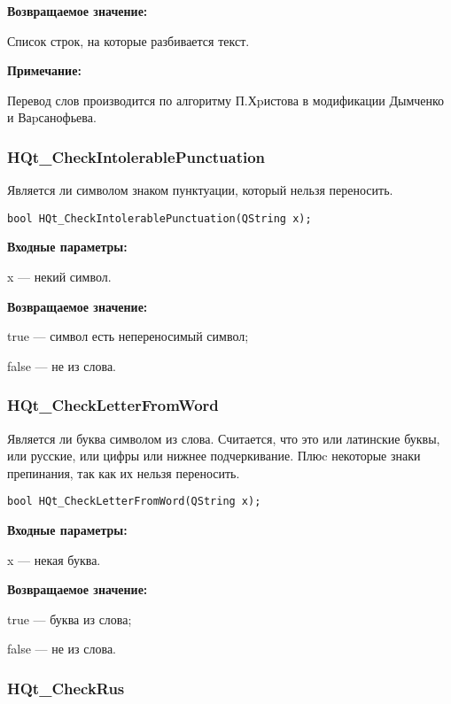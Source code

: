 \documentclass[a4paper,12pt]{article}
\begin{document}
\textbf{Возвращаемое значение:}
 
Список строк, на которые разбивается текст.

\textbf{Примечание:}

Перевод слов производится по алгоритму П.Хpистова в модификации Дымченко и Ваpсанофьева.


\subsubsection{HQt\_CheckIntolerablePunctuation}\label{HQt_CheckIntolerablePunctuation}

Является ли символом знаком пунктуации, который нельзя переносить.


\begin{lstlisting}[label=code_syntax_HQt_CheckIntolerablePunctuation,caption=Синтаксис]
bool HQt_CheckIntolerablePunctuation(QString x);
\end{lstlisting}

\textbf{Входные параметры:}

x --- некий символ.

\textbf{Возвращаемое значение:}
 
true --- символ есть непереносимый символ;

false --- не из слова.


\subsubsection{HQt\_CheckLetterFromWord}\label{HQt_CheckLetterFromWord}

Является ли буква символом из слова. Считается, что это или латинские буквы, или русские, или цифры или нижнее подчеркивание. Плюc некоторые знаки препинания, так как их нельзя переносить.


\begin{lstlisting}[label=code_syntax_HQt_CheckLetterFromWord,caption=Синтаксис]
bool HQt_CheckLetterFromWord(QString x);
\end{lstlisting}

\textbf{Входные параметры:}

x --- некая буква.

\textbf{Возвращаемое значение:}
 
true --- буква из слова;

false --- не из слова.


\subsubsection{HQt\_CheckRus}\label{HQt_CheckRus}
\end{document}

